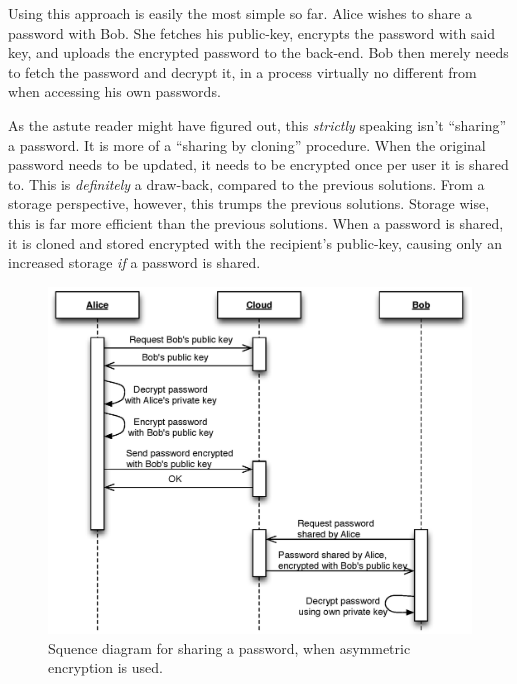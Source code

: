 				Using this approach is easily the most simple so far. Alice wishes to share a password with Bob. She fetches his public-key, encrypts the password with said key, and uploads the encrypted password to the back-end. Bob then merely needs to fetch the password and decrypt it, in a process virtually no different from when accessing his own passwords.

				As the astute reader might have figured out, this \emph{strictly} speaking isn't ``sharing'' a password. It is more of a ``sharing by cloning'' procedure. When the original password needs to be updated, it needs to be encrypted once per user it is shared to. This is \emph{definitely} a draw-back, compared to the previous solutions. From a storage perspective, however, this trumps the previous solutions. Storage wise, this is far more efficient than the previous solutions. When a password is shared, it is cloned and stored encrypted with the recipient's public-key, causing only an increased storage \emph{if} a password is shared.

				\begin{figure}[h!]
					\centering
					\includegraphics[width=\textwidth]{figures/design/uml/sequence/sharing-asymmetric.eps}
					\caption{Squence diagram for sharing a password, when asymmetric encryption is used.}
					\label{fig:sequence:asymmetric}
				\end{figure}



